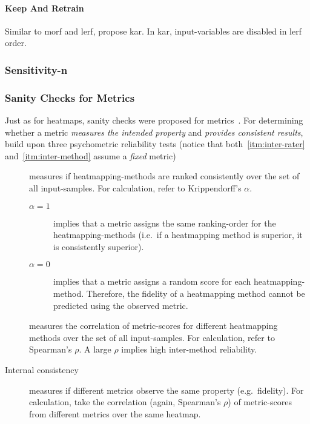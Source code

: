 \paragraph{Keep And Retrain}
Similar to \gls{morf} and \gls{lerf}, \citeauthor{Hooker.2019} propose \gls{kar}. In \gls{kar}, input-variables are disabled in \gls{lerf} order.

\subsubsection{Sensitivity-n}
\citeauthor{Ancona.}
\blindtext[1]

\subsubsection{Sanity Checks for Metrics}\label{metrics:sanity-checks}
Just as for heatmaps, sanity checks were proposed for metrics~.\cite{Tomsett.2019} For determining whether a metric \textit{measures the intended property} and \textit{provides consistent results}, \citeauthor{Tomsett.2019} build upon three psychometric reliability tests (notice that both~\ref{itm:inter-rater} and~\ref{itm:inter-method} assume a \textit{fixed} metric)
\begin{description}
    \item[] measures if heatmapping-methods are ranked consistently over the set of all input-samples.
    For calculation, \citeauthor{Tomsett.2019} refer to Krippendorff's \(\alpha\).
    \begin{description}
        \item[\(\alpha = 1\)] implies that a metric assigns the same ranking-order for the heatmapping-methods (i.e.\ if a heatmapping method is superior, it is consistently superior). 
        \item[\(\alpha = 0\)] implies that a metric assigns a random score for each heatmapping-method. Therefore, the fidelity of a heatmapping method cannot be predicted using the observed metric.
    \end{description} 
    \item[] measures the correlation of metric-scores for different heatmapping methods over the set of all input-samples. For calculation, \citeauthor{Tomsett.2019} refer to Spearman's \(\rho\). A large \(\rho\) implies high inter-method reliability.
    \item[Internal consistency] measures if different metrics observe the same property (e.g.\ fidelity). For calculation, \citeauthor{Tomsett.2019} take the correlation (again, Spearman's \(\rho\)) of metric-scores from different metrics over the same heatmap.
\end{description}

